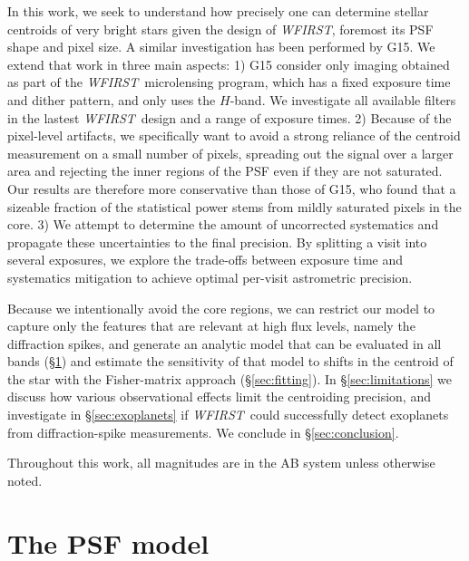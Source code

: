 \documentclass[modern, times]{aastex61}
\newcommand\wfirst{\textit{WFIRST}}
\begin{document}
In this work, we seek to understand how precisely one can determine stellar centroids of very bright stars given the design of \wfirst, foremost its PSF shape and pixel size.
A similar investigation has been performed by G15.
We extend that work in three main aspects:
1) G15 consider only imaging obtained as part of the \wfirst\ microlensing program, which has a fixed exposure time and dither pattern, and only uses the $H$-band. 
We investigate all available filters in the lastest \wfirst\ design and a range of exposure times.
2) Because of the pixel-level artifacts, we specifically want to avoid a strong reliance of the centroid measurement on a small number of pixels, spreading out the signal over a larger area and rejecting the inner regions of the PSF even if they are not saturated.
Our results are therefore more conservative than those of G15, who found that a sizeable fraction of the statistical power stems from mildly saturated pixels in the core.
3) We attempt to determine the amount of uncorrected systematics and propagate these uncertainties to the final precision.
By splitting a visit into several exposures, we explore the trade-offs between exposure time and systematics mitigation to achieve optimal per-visit astrometric precision.

Because we intentionally avoid the core regions, we can restrict our model to capture only the features that are relevant at high flux levels, namely the diffraction spikes, and generate an analytic model that can be evaluated in all bands (\S\ref{sec:model}) and estimate the sensitivity of that model to shifts in the centroid of the star with the Fisher-matrix approach (\S\ref{sec:fitting}).
In \S\ref{sec:limitations} we discuss how various observational effects limit the centroiding precision, and investigate in \S\ref{sec:exoplanets} if \wfirst\ could successfully detect exoplanets from diffraction-spike measurements.
We conclude in \S\ref{sec:conclusion}.

Throughout this work, all magnitudes are in the AB system unless otherwise noted.

\section{The PSF model}
\label{sec:model}
\end{document}

